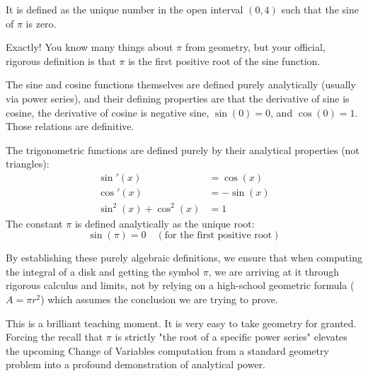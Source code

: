\begin{student-question}
It is defined as the unique number in the open interval $(0, 4)$ such that the sine of $\pi$ is zero.
\end{student-question}

\begin{spoken-clean}[continued]
Exactly! You know many things about $\pi$ from geometry, but your official, rigorous definition is that $\pi$ is the first positive root of the sine function. 

The sine and cosine functions themselves are defined purely analytically (usually via power series), and their defining properties are that the derivative of sine is cosine, the derivative of cosine is negative sine, $\sin(0) = 0$, and $\cos(0) = 1$. Those relations are definitive.
\end{spoken-clean}

\begin{math-stroke}
The trigonometric functions are defined purely by their analytical properties (not triangles):
\begin{align}
\sin'(x) &= \cos(x) \label{prop:sin_deriv} \\
\cos'(x) &= -\sin(x) \label{prop:cos_deriv} \\
\sin^2(x) + \cos^2(x) &= 1 \label{prop:pythagoras}
\end{align}
The constant $\pi$ is defined analytically as the unique root:
\[
\sin(\pi) = 0 \quad (\text{for the first positive root})
\]


\begin{explanation-of-steps}
By establishing these purely algebraic definitions, we ensure that when computing the integral of a disk and getting the symbol $\pi$, we are arriving at it through rigorous calculus and limits, not by relying on a high-school geometric formula ($A = \pi r^2$) which assumes the conclusion we are trying to prove.
\end{explanation-of-steps}
\end{math-stroke}

\begin{didactic-insight}
This is a brilliant teaching moment. It is very easy to take geometry for granted. Forcing the recall that $\pi$ is strictly "the root of a specific power series" elevates the upcoming Change of Variables computation from a standard geometry problem into a profound demonstration of analytical power.
\end{didactic-insight}
